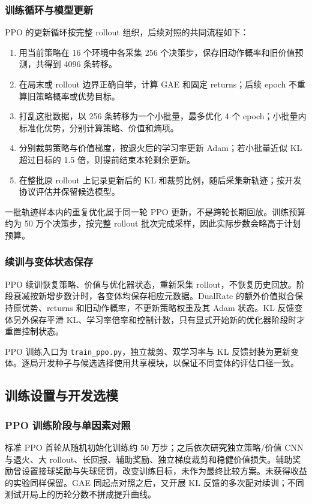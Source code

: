 
\subsubsection{训练循环与模型更新}
PPO 的更新循环按完整 rollout 组织，后续对照的共同流程如下：
\begin{enumerate}
 \item 用当前策略在 16 个环境中各采集 256 个决策步，保存旧动作概率和旧价值预测，共得到 4096 条转移。
 \item 在局末或 rollout 边界正确自举，计算 GAE 和固定 returns；后续 epoch 不重算旧策略概率或优势目标。
 \item 打乱这批数据，以 256 条转移为一个小批量，最多优化 4 个 epoch；小批量内标准化优势，分别计算策略、价值和熵项。
 \item 分别裁剪策略与价值梯度，按退火后的学习率更新 Adam；若小批量近似 KL 超过目标的 1.5 倍，则提前结束本轮剩余更新。
 \item 在整批原 rollout 上记录更新后的 KL 和裁剪比例，随后采集新轨迹；按开发协议评估并保留候选模型。
\end{enumerate}
一批轨迹样本内的重复优化属于同一轮 PPO 更新，不是跨轮长期回放。训练预算约为 50 万个决策步，按完整 rollout 批次完成采样，因此实际步数会略高于计划预算。

\subsubsection{续训与变体状态保存}
PPO 续训恢复策略、价值与优化器状态，重新采集 rollout，不恢复历史回放。阶段衰减按新增步数计时，各变体均保存相应元数据。DualRate 的额外价值拟合保持原优势、returns 和旧动作概率，不更新策略权重及其 Adam 状态。KL 反馈变体另外保存平滑 KL、学习率倍率和控制计数，只有显式开始新的优化器阶段时才重置控制状态。

PPO 训练入口为 \texttt{train\_ppo.py}，独立裁剪、双学习率与 KL 反馈封装为更新变体。逐局开发种子与候选选择使用共享模块，以保证不同变体的评估口径一致。

\subsection{训练设置与开发选模}
\subsubsection{PPO 训练阶段与单因素对照}
标准 PPO 首轮从随机初始化训练约 50 万步；之后依次研究独立策略/价值 CNN 与退火、大 rollout、长回报、辅助奖励、独立梯度裁剪和稳健价值损失。辅助奖励曾设置接球奖励与失球惩罚，改变训练目标，未作为最终比较方案。未获得收益的实验同样保留。GAE 同起点对照之后，又开展 KL 反馈的多次配对续训；不同测试开局上的历轮分数不拼成提升曲线。

